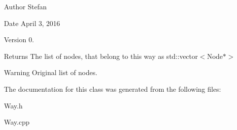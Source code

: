 \begin{DoxyAuthor}{Author}
Stefan 
\end{DoxyAuthor}
\begin{DoxyDate}{Date}
April 3, 2016 
\end{DoxyDate}
\begin{DoxyVersion}{Version}
0.
\end{DoxyVersion}
\begin{DoxyReturn}{Returns}
The list of nodes, that belong to this way as std\+::vector$<$\+Node$\ast$$>$
\end{DoxyReturn}
\begin{DoxyWarning}{Warning}
Original list of nodes. 
\end{DoxyWarning}


The documentation for this class was generated from the following files\+:\begin{DoxyCompactItemize}
\item 
Way.\+h\item 
Way.\+cpp\end{DoxyCompactItemize}
